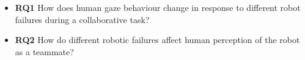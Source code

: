 \vspace{0.5em} %

\begin{itemize}
\item \textbf{RQ1} How does human gaze behaviour change in response to different robot failures during a collaborative task?
\vspace{0.5em} %

\item \textbf{RQ2} How do different robotic failures affect human perception of the robot as a teammate?
\end{itemize}


